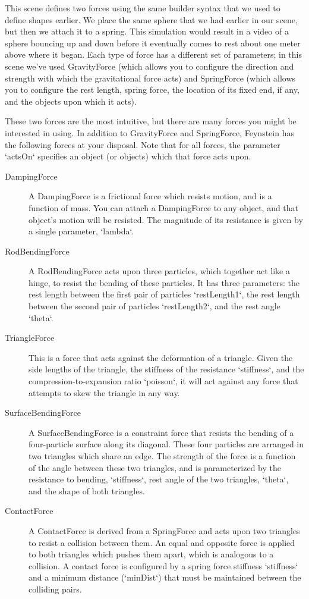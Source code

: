 This scene defines two forces using the same builder syntax that we
used to define shapes earlier. We place the same sphere that we had
earlier in our scene, but then we attach it to a spring. This
simulation would result in a video of a sphere bouncing up and down
before it eventually comes to rest about one meter above where it
began. Each type of force has a different set of parameters; in this
scene we've used GravityForce (which allows you to configure the
direction and strength with which the gravitational force acts) and
SpringForce (which allows you to configure the rest length, spring
force, the location of its fixed end, if any, and the objects upon
which it acts).

These two forces are the most intuitive, but there are many forces you
might be interested in using. In addition to GravityForce and
SpringForce, Feynstein has the following forces at your disposal. Note
that for all forces, the parameter `actsOn` specifies an object (or
objects) which that force acts upon.

\begin{description}
\item[DampingForce] A DampingForce is a frictional force which resists
  motion, and is a function of mass. You can attach a DampingForce to
  any object, and that object's motion will be resisted. The magnitude
  of its resistance is given by a single parameter, `lambda`.

\item[RodBendingForce] A RodBendingForce acts upon three particles, which
  together act like a hinge, to resist the bending of these
  particles. It has three parameters: the rest length between the
  first pair of particles `restLength1`, the rest length between the
  second pair of particles `restLength2`, and the rest angle `theta`.

\item[TriangleForce] This is a force that acts against the
  deformation of a triangle. Given the side lengths of the triangle,
  the stiffness of the resistance `stiffness`, and the
  compression-to-expansion ratio `poisson`, it will act against any
  force that attempts to skew the triangle in any way.

\item[SurfaceBendingForce] A SurfaceBendingForce is a constraint force that
  resists the bending of a four-particle surface along its diagonal.
  These four particles are arranged in two triangles which share an
  edge. The strength of the force is a function of the angle between
  these two triangles, and is parameterized by the resistance to
  bending, `stiffness`, rest angle of the two triangles, `theta`, and
  the shape of both triangles.

\item[ContactForce] A ContactForce is derived from a SpringForce and acts
  upon two triangles to resist a collision between them. An equal and
  opposite force is applied to both triangles which pushes them apart,
  which is analogous to a collision. A contact force is configured by
  a spring force stiffness `stiffness` and a minimum distance
  (`minDist`) that must be maintained between the colliding pairs.
\end{description}

